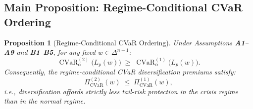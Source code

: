 \documentclass[12pt,openany]{book}
\newcommand{\bfw}{\mathbf{w}}
\DeclareMathOperator{\CVaR}{CVaR}
\numberwithin{equation}{chapter}
\theoremstyle{plain}
\newtheorem{proposition}[theorem]{Proposition}
\theoremstyle{definition}
\theoremstyle{remark}
\def\bfw{w}%
\begin{document}
\subsection{Main Proposition: Regime-Conditional CVaR Ordering}

\begin{proposition}[Regime-Conditional CVaR Ordering]
\label{prop:regime-cvar}
Under Assumptions \textbf{A1}--\textbf{A9} and
\textbf{B1}--\textbf{B5}, for any fixed
$\bfw \in \Delta^{n-1}$:
\begin{equation}
  \CVaR_\alpha^{(2)}\!\bigl(L_p(\bfw)\bigr)
  \;\geq\;
  \CVaR_\alpha^{(1)}\!\bigl(L_p(\bfw)\bigr).
  \label{eq:regime-cvar}
\end{equation}
Consequently, the regime-conditional CVaR diversification premiums
satisfy:
\begin{equation}
  \Pi_{\mathrm{CVaR}}^{(2)}(\bfw)
  \;\leq\;
  \Pi_{\mathrm{CVaR}}^{(1)}(\bfw),
  \label{eq:regime-premium-order}
\end{equation}
i.e., diversification affords strictly less tail-risk protection in
the crisis regime than in the normal regime.
\end{proposition}
\end{document}
